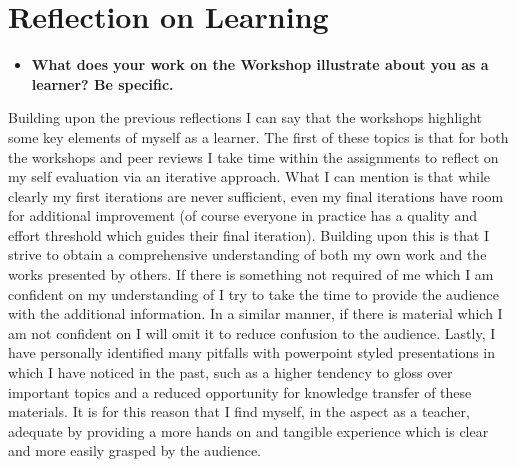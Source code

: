 \documentclass[12pt]{article}
\begin{document}
\section{Reflection on Learning}
\begin{itemize}
    \item \textbf{What does your work on the Workshop illustrate about you as a learner? Be specific.}
\end{itemize}

Building upon the previous reflections I can say that the workshops highlight some key elements of myself as a learner. The first of these topics is that for both the workshops and peer reviews I take time within the assignments to reflect on my self evaluation via an iterative approach. What I can mention is that while clearly my first iterations are never sufficient, even my final iterations have room for additional improvement (of course everyone in practice has a quality and effort threshold which guides their final iteration). Building upon this is that I strive to obtain a comprehensive understanding of both my own work and the works presented by others. If there is something not required of me which I am confident on my understanding of I try to take the time to provide the audience with the additional information. In a similar manner, if there is material which I am not confident on I will omit it to reduce confusion to the audience. Lastly, I have personally identified many pitfalls with powerpoint styled presentations in which I have noticed in the past, such as a higher tendency to gloss over important topics and a reduced opportunity for knowledge transfer of these materials. It is for this reason that I find myself, in the aspect as a teacher, adequate by providing a more hands on and tangible experience which is clear and more easily grasped by the audience. 
\end{document}
